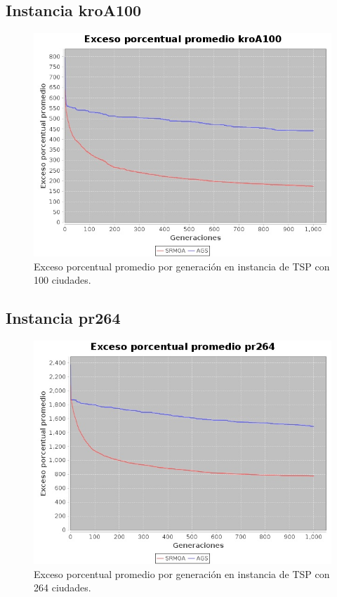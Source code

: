 \documentclass[12pt]{article}
\begin{document}
\subsection{Instancia kroA100}
\begin{figure}[H]
  \centering
  \includegraphics[width=1\textwidth]{graficas/kroA100}
  \caption{Exceso porcentual promedio por generación en instancia de TSP con 100 ciudades.}
\end{figure}
\subsection{Instancia pr264}
\begin{figure}[H]
  \centering
  \includegraphics[width=1\textwidth]{graficas/pr264}
  \caption{Exceso porcentual promedio por generación en instancia de TSP con 264 ciudades.}
\end{figure}
\end{document}
